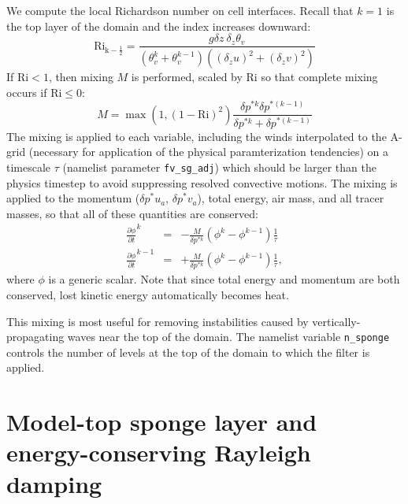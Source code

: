 \documentclass[12pt,letterpaper]{book}
\begin{document}
We compute the local Richardson number on cell interfaces. Recall that $k=1$ is the top layer of the domain and the index increases downward:
\begin{equation}
\mathrm{Ri_{k-\frac{1}{2}} } = \frac{g\delta z \:\delta_{z}\theta_v }{(\theta_v^k + \theta_v^{k-1}) ( (\delta_z u)^2 + (\delta_z v)^2) }
\end{equation}
If $\mathrm{Ri} < 1$, then mixing $M$ is performed, scaled by Ri so that complete mixing occurs if $\mathrm{Ri} \le 0:$
\begin{equation}
M = \max\left ( 1, \left(1 - \mathrm{Ri} \right )^2 \right )\frac{\delta p^{*k} \delta p^{*(k-1)}}{\delta p^{*k} + \delta p^{*(k-1)}} 
\end{equation} 
The mixing is applied to each variable, including the winds interpolated to the A-grid (necessary for application of the physical paramterization tendencies) on a timescale $\tau$ (namelist parameter \texttt{fv\_sg\_adj}) which should be larger than the physics timestep to avoid suppressing resolved convective motions. The mixing is applied to the momentum ($\delta p^* u_a$, $\delta p^* v_a$), total energy, air mass, and all tracer masses, so that all of these quantities are conserved:
\begin{eqnarray} 
\frac{\partial \phi}{\partial t}^k & = & - \frac{M}{\delta p^{*k}} \left ( \phi^k - \phi^{k-1} \right ) \frac{1}{\tau} \\
\frac{\partial \phi}{\partial t}^{k-1} & = & + \frac{M}{\delta p^{*k}} \left ( \phi^k - \phi^{k-1} \right ) \frac{1}{\tau},
\end{eqnarray}
where $\phi$ is a generic scalar. Note that since total energy and momentum are both conserved, lost kinetic energy automatically becomes heat. 

This mixing is most useful for removing instabilities caused by vertically-propagating waves near the top of the domain. The namelist variable \texttt{n\_sponge} controls the number of levels at the top of the domain to which the filter is applied.

\section{Model-top sponge layer and energy-conserving Rayleigh damping}
\end{document}
